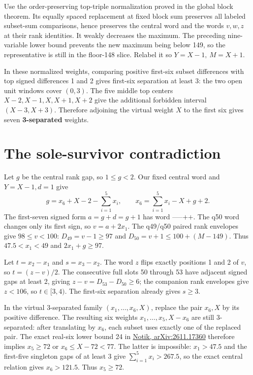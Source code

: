 \documentclass[10pt,letterpaper]{article}
\begin{document}
Use the order-preserving top-triple normalization proved in the global
block theorem. Its equally spaced replacement at fixed block sum
preserves all labeled subset-sum comparisons, hence preserves the
central word and the words \(v,w,z\) at their rank identities. It weakly
decreases the maximum. The preceding nine-variable lower bound prevents
the new maximum being below 149, so the representative is still in the
floor-148 slice. Relabel it so \(Y=X-1,\ M=X+1\).

In these normalized weights, comparing positive first-six subset
differences with top signed differences 1 and 2 gives first-six
separation at least 3: the two open unit windows cover \((0,3)\). The
five middle top centers \(X-2,X-1,X,X+1,X+2\) give the additional
forbidden interval \((X-3,X+3)\). Therefore adjoining the virtual weight
\(X\) to the first six gives seven \textbf{3-separated} weights.

\section{The sole-survivor
contradiction}\label{the-sole-survivor-contradiction}

Let \(g\) be the central rank gap, so \(1\le g<2\). Our fixed central
word and \(Y=X-1,d=1\) give \[
 g=x_6+X-2-\sum_{i=1}^5x_i,\qquad
 x_6=\sum_{i=1}^5x_i-X+g+2.
\] The first-seven signed form \(a=g+d=g+1\) has word
\(\texttt{-----++}\). The q50 word changes only its first sign, so
\(v=a+2x_1\). The q49/q50 paired rank envelopes give \(98\le v<100\):
\(D_{49}=v-1\ge97\) and \(D_{50}=v+1\le100+(M-149)\). Thus
\(47.5<x_1<49\) and \(2x_1+g\ge97\).

Let \(t=x_2-x_1\) and \(s=x_3-x_2\). The word \(z\) flips exactly
positions 1 and 2 of \(v\), so \(t=(z-v)/2\). The consecutive full slots
50 through 53 have adjacent signed gaps at least 2, giving
\(z-v=D_{53}-D_{50}\ge6\); the companion rank envelopes give \(z<106\),
so \(t\in[3,4)\). The first-six separation already gives \(s\ge3\).

In the virtual 3-separated family \((x_1,\ldots,x_6,X)\), replace the
pair \(x_6,X\) by its positive difference. The resulting six weights
\(x_1,\ldots,x_5,X-x_6\) are still 3-separated: after translating by
\(x_6\), each subset uses exactly one of the replaced pair. The exact
real-six lower bound 24 in
\href{https://arxiv.org/abs/2611.17360}{Notik, arXiv:2611.17360}
therefore implies \(x_5\ge72\) or \(x_6\le X-72<77\). The latter is
impossible: \(x_1>47.5\) and the first-five singleton gaps of at least 3
give \(\sum_{i=1}^5x_i>267.5\), so the exact central relation gives
\(x_6>121.5\). Thus \(x_5\ge72\).
\end{document}

